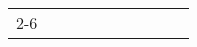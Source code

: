 


\renewcommand{\arraystretch}{1.25}%
\begin{tabular}{c|m{6cm}|cm{0.75cm}|cm{0.75cm}|cm{0.75cm}|cm{0.75cm}|}
\cline{2-6}


\end{tabular}
